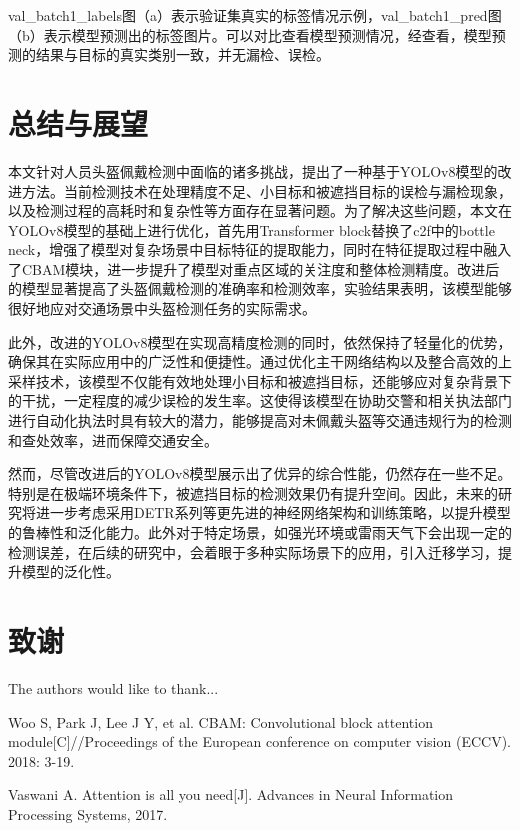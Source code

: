\documentclass[journal]{IEEEtran}
\numberwithin{figure}{section}%
\numberwithin{table}{section}%
\numberwithin{equation}{section}
\begin{document}
val\_batch1\_labels图（a）表示验证集真实的标签情况示例，val\_batch1\_pred图（b）表示模型预测出的标签图片。可以对比查看模型预测情况，经查看，模型预测的结果与目标的真实类别一致，并无漏检、误检。

\setcounter{equation}{0}

\section{总结与展望}
本文针对人员头盔佩戴检测中面临的诸多挑战，提出了一种基于YOLOv8模型的改进方法。当前检测技术在处理精度不足、小目标和被遮挡目标的误检与漏检现象，以及检测过程的高耗时和复杂性等方面存在显著问题。为了解决这些问题，本文在YOLOv8模型的基础上进行优化，首先用Transformer block替换了c2f中的bottle neck，增强了模型对复杂场景中目标特征的提取能力，同时在特征提取过程中融入了CBAM模块，进一步提升了模型对重点区域的关注度和整体检测精度。改进后的模型显著提高了头盔佩戴检测的准确率和检测效率，实验结果表明，该模型能够很好地应对交通场景中头盔检测任务的实际需求。\par
此外，改进的YOLOv8模型在实现高精度检测的同时，依然保持了轻量化的优势，确保其在实际应用中的广泛性和便捷性。通过优化主干网络结构以及整合高效的上采样技术，该模型不仅能有效地处理小目标和被遮挡目标，还能够应对复杂背景下的干扰，一定程度的减少误检的发生率。这使得该模型在协助交警和相关执法部门进行自动化执法时具有较大的潜力，能够提高对未佩戴头盔等交通违规行为的检测和查处效率，进而保障交通安全。\par
然而，尽管改进后的YOLOv8模型展示出了优异的综合性能，仍然存在一些不足。特别是在极端环境条件下，被遮挡目标的检测效果仍有提升空间。因此，未来的研究将进一步考虑采用DETR系列等更先进的神经网络架构和训练策略，以提升模型的鲁棒性和泛化能力。此外对于特定场景，如强光环境或雷雨天气下会出现一定的检测误差，在后续的研究中，会着眼于多种实际场景下的应用，引入迁移学习，提升模型的泛化性。

\section*{致谢}


The authors would like to thank...


\ifCLASSOPTIONcaptionsoff
  \newpage
\fi



\begin{thebibliography}{1}

Woo S, Park J, Lee J Y, et al. CBAM: Convolutional block attention module[C]//Proceedings of the European conference on computer vision (ECCV). 2018: 3-19.

Vaswani A. Attention is all you need[J]. Advances in Neural Information Processing Systems, 2017.

\end{thebibliography}


\end{document}
